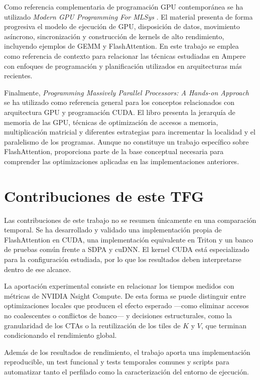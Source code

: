 Como referencia complementaria de programación GPU contemporánea se ha utilizado \textit{Modern GPU Programming For MLSys} \cite{mlcModernGPU}. El material presenta de forma progresiva el modelo de ejecución de GPU, disposición de datos, movimiento asíncrono, sincronización y construcción de kernels de alto rendimiento, incluyendo ejemplos de GEMM y FlashAttention. En este trabajo se emplea como referencia de contexto para relacionar las técnicas estudiadas en Ampere con enfoques de programación y planificación utilizados en arquitecturas más recientes.

Finalmente, \textit{Programming Massively Parallel Processors: A Hands-on Approach} \cite{kirkHwuPMPP} se ha utilizado como referencia general para los conceptos relacionados con arquitectura GPU y programación CUDA. El libro presenta la jerarquía de memoria de las GPU, técnicas de optimización de accesos a memoria, multiplicación matricial y diferentes estrategias para incrementar la localidad y el paralelismo de los programas. Aunque no constituye un trabajo específico sobre FlashAttention, proporciona parte de la base conceptual necesaria para comprender las optimizaciones aplicadas en las implementaciones anteriores.

\section{Contribuciones de este TFG}

Las contribuciones de este trabajo no se resumen únicamente en una comparación temporal. Se ha desarrollado y validado una implementación propia de FlashAttention en CUDA, una implementación equivalente en Triton y un banco de pruebas común frente a SDPA y cuDNN. El kernel CUDA está especializado para la configuración estudiada, por lo que los resultados deben interpretarse dentro de ese alcance.

La aportación experimental consiste en relacionar los tiempos medidos con métricas de NVIDIA Nsight Compute. De esta forma se puede distinguir entre optimizaciones locales que producen el efecto esperado —como eliminar accesos no coalescentes o conflictos de banco— y decisiones estructurales, como la granularidad de los CTAs o la reutilización de los tiles de \(K\) y \(V\), que terminan condicionando el rendimiento global.

Además de los resultados de rendimiento, el trabajo aporta una implementación reproducible, un test funcional y tests temporales comunes y scripts para automatizar tanto el perfilado como la caracterización del entorno de ejecución.
